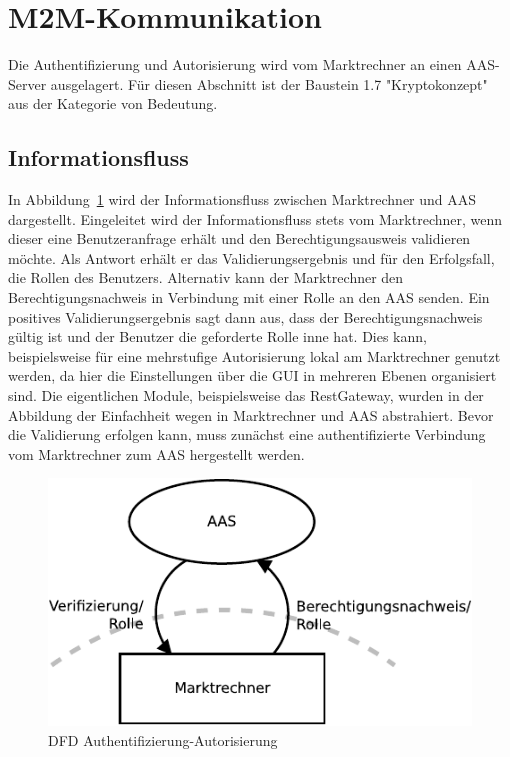 \documentclass[11pt,a4paper]{report}
\begin{document}
\section{M2M-Kommunikation} \label{sec:model_auth}

Die Authentifizierung und Autorisierung wird vom Marktrechner an einen AAS-Server ausgelagert. Für diesen Abschnitt ist der Baustein 1.7 "Kryptokonzept" aus der Kategorie von Bedeutung.

\subsection{Informationsfluss}

In Abbildung~\ref{fig:dfd_auth} wird der Informationsfluss zwischen Marktrechner und AAS dargestellt. Eingeleitet wird der Informationsfluss stets vom Marktrechner, wenn dieser eine Benutzeranfrage erhält und den Berechtigungsausweis validieren möchte. Als Antwort erhält er das Validierungsergebnis und für den Erfolgsfall, die Rollen des Benutzers. Alternativ kann der Marktrechner den Berechtigungsnachweis in Verbindung mit einer Rolle an den AAS senden. Ein positives Validierungsergebnis sagt dann aus, dass der Berechtigungsnachweis gültig ist und der Benutzer die geforderte Rolle inne hat. Dies kann, beispielsweise für eine mehrstufige Autorisierung lokal am Marktrechner genutzt werden, da hier die Einstellungen über die GUI in mehreren Ebenen organisiert sind. Die eigentlichen Module, beispielsweise das RestGateway, wurden in der Abbildung der Einfachheit wegen in Marktrechner und AAS abstrahiert. Bevor die Validierung erfolgen kann, muss zunächst eine authentifizierte Verbindung vom Marktrechner zum AAS hergestellt werden.

\begin{figure}[htbp]
\centering
\includegraphics[scale=1.1]{images/dfd_auth.pdf}
\caption{DFD Authentifizierung-Autorisierung}
\label{fig:dfd_auth}
\end{figure}
\end{document}
